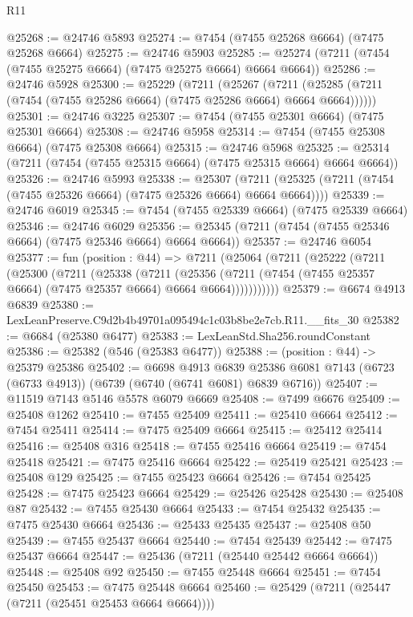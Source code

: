 \begin{lexlean}{R11}
\begin{coremodule}
@25268 := @24746 @5893
@25274 := @7454 (@7455 @25268 @6664) (@7475 @25268 @6664)
@25275 := @24746 @5903
@25285 := @25274 (@7211 (@7454 (@7455 @25275 @6664) (@7475 @25275 @6664) @6664 @6664))
@25286 := @24746 @5928
@25300 := @25229
    (@7211
      (@25267
        (@7211 (@25285 (@7211 (@7454 (@7455 @25286 @6664) (@7475 @25286 @6664) @6664 @6664))))))
@25301 := @24746 @3225
@25307 := @7454 (@7455 @25301 @6664) (@7475 @25301 @6664)
@25308 := @24746 @5958
@25314 := @7454 (@7455 @25308 @6664) (@7475 @25308 @6664)
@25315 := @24746 @5968
@25325 := @25314 (@7211 (@7454 (@7455 @25315 @6664) (@7475 @25315 @6664) @6664 @6664))
@25326 := @24746 @5993
@25338 := @25307
    (@7211 (@25325 (@7211 (@7454 (@7455 @25326 @6664) (@7475 @25326 @6664) @6664 @6664))))
@25339 := @24746 @6019
@25345 := @7454 (@7455 @25339 @6664) (@7475 @25339 @6664)
@25346 := @24746 @6029
@25356 := @25345 (@7211 (@7454 (@7455 @25346 @6664) (@7475 @25346 @6664) @6664 @6664))
@25357 := @24746 @6054
@25377 := fun (position : @44) =>
  @7211
    (@25064
      (@7211
        (@25222
          (@7211
            (@25300
              (@7211
                (@25338
                  (@7211
                    (@25356
                      (@7211 (@7454 (@7455 @25357 @6664) (@7475 @25357 @6664) @6664 @6664)))))))))))
@25379 := @6674 @4913 @6839
@25380 := LexLeanPreserve.C9d2b4b49701a095494c1c03b8be2e7cb.R11.__fits_30
@25382 := @6684 (@25380 @6477)
@25383 := LexLeanStd.Sha256.roundConstant
@25386 := @25382 (@546 (@25383 @6477))
@25388 := (position : @44) -> @25379 @25386
@25402 := @6698
    @4913
    @6839
    @25386
    @6081
    @7143
    (@6723 (@6733 @4913))
    (@6739 (@6740 (@6741 @6081) @6839 @6716))
@25407 := @11519 @7143 @5146 @5578 @6079 @6669
@25408 := @7499 @6676
@25409 := @25408 @1262
@25410 := @7455 @25409
@25411 := @25410 @6664
@25412 := @7454 @25411
@25414 := @7475 @25409 @6664
@25415 := @25412 @25414
@25416 := @25408 @316
@25418 := @7455 @25416 @6664
@25419 := @7454 @25418
@25421 := @7475 @25416 @6664
@25422 := @25419 @25421
@25423 := @25408 @129
@25425 := @7455 @25423 @6664
@25426 := @7454 @25425
@25428 := @7475 @25423 @6664
@25429 := @25426 @25428
@25430 := @25408 @87
@25432 := @7455 @25430 @6664
@25433 := @7454 @25432
@25435 := @7475 @25430 @6664
@25436 := @25433 @25435
@25437 := @25408 @50
@25439 := @7455 @25437 @6664
@25440 := @7454 @25439
@25442 := @7475 @25437 @6664
@25447 := @25436 (@7211 (@25440 @25442 @6664 @6664))
@25448 := @25408 @92
@25450 := @7455 @25448 @6664
@25451 := @7454 @25450
@25453 := @7475 @25448 @6664
@25460 := @25429 (@7211 (@25447 (@7211 (@25451 @25453 @6664 @6664))))

\end{coremodule}
\end{lexlean}
